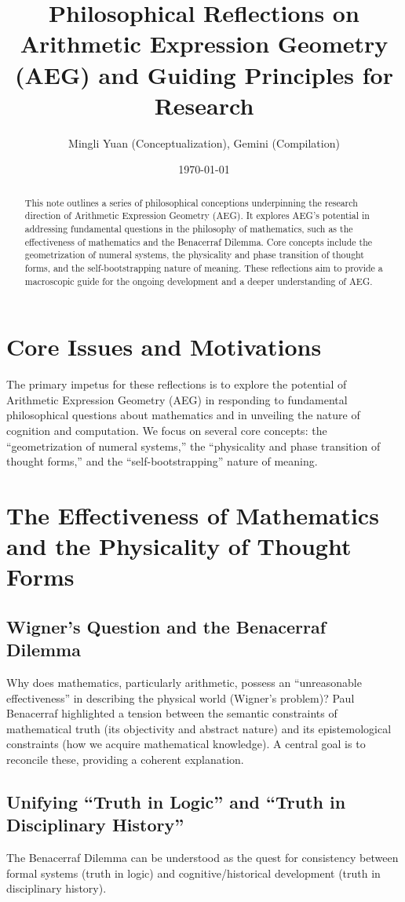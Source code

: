 \documentclass{article}
\title{Philosophical Reflections on Arithmetic Expression Geometry (AEG) and Guiding Principles for Research}
\author{Mingli Yuan (Conceptualization), Gemini (Compilation)}
\date{\today}
\begin{document}
\maketitle
\begin{abstract}
This note outlines a series of philosophical conceptions underpinning the research direction of Arithmetic Expression Geometry (AEG). It explores AEG's potential in addressing fundamental questions in the philosophy of mathematics, such as the effectiveness of mathematics and the Benacerraf Dilemma. Core concepts include the geometrization of numeral systems, the physicality and phase transition of thought forms, and the self-bootstrapping nature of meaning. These reflections aim to provide a macroscopic guide for the ongoing development and a deeper understanding of AEG.
\end{abstract}

\section{Core Issues and Motivations}
The primary impetus for these reflections is to explore the potential of Arithmetic Expression Geometry (AEG) in responding to fundamental philosophical questions about mathematics and in unveiling the nature of cognition and computation. We focus on several core concepts: the ``geometrization of numeral systems,'' the ``physicality and phase transition of thought forms,'' and the ``self-bootstrapping'' nature of meaning.

\section{The Effectiveness of Mathematics and the Physicality of Thought Forms}

\subsection{Wigner's Question and the Benacerraf Dilemma}
Why does mathematics, particularly arithmetic, possess an ``unreasonable effectiveness'' in describing the physical world (Wigner's problem)? Paul Benacerraf highlighted a tension between the semantic constraints of mathematical truth (its objectivity and abstract nature) and its epistemological constraints (how we acquire mathematical knowledge). A central goal is to reconcile these, providing a coherent explanation.

\subsection{Unifying ``Truth in Logic'' and ``Truth in Disciplinary History''}
The Benacerraf Dilemma can be understood as the quest for consistency between formal systems (truth in logic) and cognitive/historical development (truth in disciplinary history).
\end{document}
